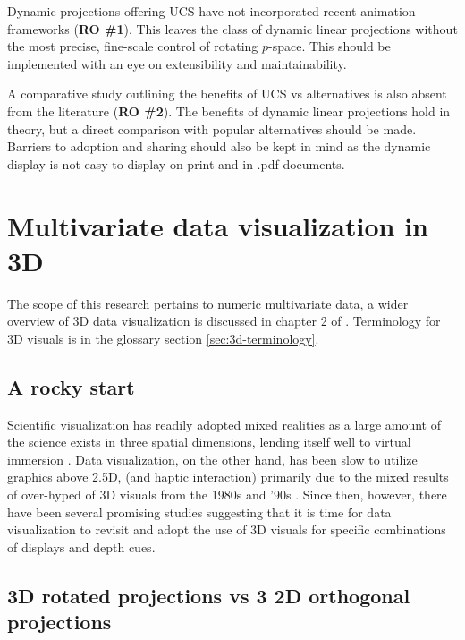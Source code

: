 \documentclass{monashthesis}
\begin{document}
Dynamic projections offering UCS have not incorporated recent animation frameworks (\textbf{RO \#1}). This leaves the class of dynamic linear projections without the most precise, fine-scale control of rotating \(p\)-space. This should be implemented with an eye on extensibility and maintainability.

A comparative study outlining the benefits of UCS vs alternatives is also absent from the literature (\textbf{RO \#2}). The benefits of dynamic linear projections hold in theory, but a direct comparison with popular alternatives should be made. Barriers to adoption and sharing should also be kept in mind as the dynamic display is not easy to display on print and in .pdf documents.

\hypertarget{sec:3d}{%
\section{Multivariate data visualization in 3D}\label{sec:3d}}

The scope of this research pertains to numeric multivariate data, a wider overview of 3D data visualization is discussed in chapter 2 of \textcite{marriott_immersive_2018}. Terminology for 3D visuals is in the glossary section \ref{sec:3d-terminology}.

\hypertarget{a-rocky-start}{%
\subsection{A rocky start}\label{a-rocky-start}}

Scientific visualization has readily adopted mixed realities as a large amount of the science exists in three spatial dimensions, lending itself well to virtual immersion \autocite{marriott_immersive_2018}. Data visualization, on the other hand, has been slow to utilize graphics above 2.5D, (and haptic interaction) primarily due to the mixed results of over-hyped of 3D visuals from the 1980s and '90s \autocite{munzner_visualization_2014}. Since then, however, there have been several promising studies suggesting that it is time for data visualization to revisit and adopt the use of 3D visuals for specific combinations of displays and depth cues.

\hypertarget{d-rotated-projections-vs-3-2d-orthogonal-projections}{%
\subsection{3D rotated projections vs 3 2D orthogonal projections}\label{d-rotated-projections-vs-3-2d-orthogonal-projections}}
\end{document}
